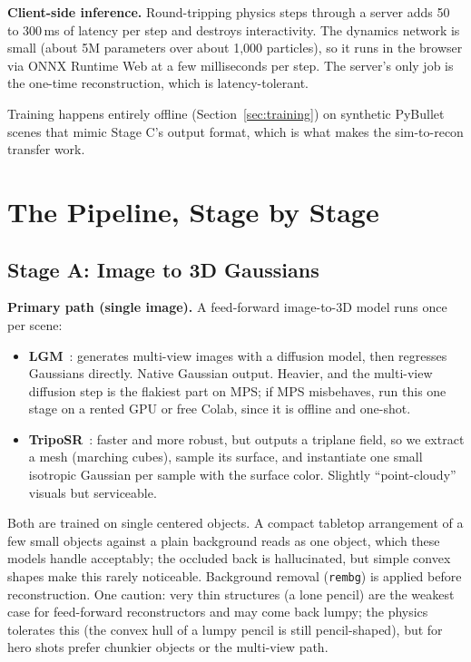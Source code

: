 \documentclass[11pt]{article}
\begin{document}
\textbf{Client-side inference.} Round-tripping physics steps through a server adds 50 to 300\,ms of latency per step and destroys interactivity. The dynamics network is small (about 5M parameters over about 1{,}000 particles), so it runs in the browser via ONNX Runtime Web at a few milliseconds per step. The server's only job is the one-time reconstruction, which is latency-tolerant.

Training happens entirely offline (Section~\ref{sec:training}) on synthetic PyBullet scenes that mimic Stage C's output format, which is what makes the sim-to-recon transfer work.

\section{The Pipeline, Stage by Stage}

\subsection{Stage A: Image to 3D Gaussians}
\label{sec:stageA}

\textbf{Primary path (single image).} A feed-forward image-to-3D model runs once per scene:
\begin{itemize}[itemsep=2pt]
  \item \textbf{LGM}~\cite{lgm}: generates multi-view images with a diffusion model, then regresses Gaussians directly. Native Gaussian output. Heavier, and the multi-view diffusion step is the flakiest part on MPS; if MPS misbehaves, run this one stage on a rented GPU or free Colab, since it is offline and one-shot.
  \item \textbf{TripoSR}~\cite{triposr}: faster and more robust, but outputs a triplane field, so we extract a mesh (marching cubes), sample its surface, and instantiate one small isotropic Gaussian per sample with the surface color. Slightly ``point-cloudy'' visuals but serviceable.
\end{itemize}
Both are trained on single centered objects. A compact tabletop arrangement of a few small objects against a plain background reads as one object, which these models handle acceptably; the occluded back is hallucinated, but simple convex shapes make this rarely noticeable. Background removal (\texttt{rembg}) is applied before reconstruction. One caution: very thin structures (a lone pencil) are the weakest case for feed-forward reconstructors and may come back lumpy; the physics tolerates this (the convex hull of a lumpy pencil is still pencil-shaped), but for hero shots prefer chunkier objects or the multi-view path.
\end{document}
